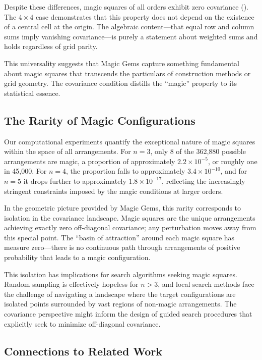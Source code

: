 Despite these differences, magic squares of all orders exhibit zero covariance ().
The $4 \times 4$ case demonstrates that this property does not depend on
the existence of a central cell at the origin.
The algebraic content---that equal row and column sums imply vanishing covariance---is 
purely a statement about weighted sums and holds regardless of grid parity.

This universality suggests that Magic Gems capture something fundamental about magic squares
that transcends the particulars of construction methods or grid geometry.
The covariance condition distills the ``magic'' property to its statistical essence.

\subsection{The Rarity of Magic Configurations}

Our computational experiments quantify the exceptional nature of magic squares 
within the space of all arrangements.
For $n = 3$, only 8 of the 362,880 possible arrangements are magic,
a proportion of approximately $2.2 \times 10^{-5}$, or roughly one in 45,000.
For $n = 4$, the proportion falls to approximately $3.4 \times 10^{-10}$,
and for $n = 5$ it drops further to approximately $1.8 \times 10^{-17}$,
reflecting the increasingly stringent constraints imposed by the magic conditions at larger orders.

In the geometric picture provided by Magic Gems, this rarity corresponds to isolation in the covariance landscape.
Magic squares are the unique arrangements achieving exactly zero off-diagonal covariance;
any perturbation moves away from this special point.
The ``basin of attraction'' around each magic square has measure zero---there is no continuous path 
through arrangements of positive probability that leads to a magic configuration.

This isolation has implications for search algorithms seeking magic squares.
Random sampling is effectively hopeless for $n > 3$, and local search methods face 
the challenge of navigating a landscape where the target configurations are isolated points 
surrounded by vast regions of non-magic arrangements.
The covariance perspective might inform the design of guided search procedures
that explicitly seek to minimize off-diagonal covariance.

\subsection{Connections to Related Work}


